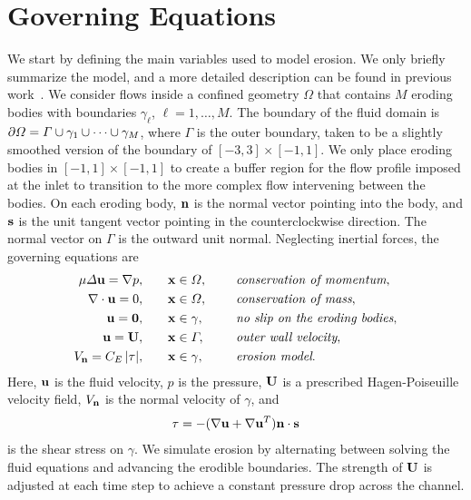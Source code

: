 \documentclass{jfm}
\begin{document}
\section{Governing Equations}
\label{sec:formulation}
We start by defining the main variables used to model erosion.  We only
briefly summarize the model, and a more detailed description can be
found in previous work~\citep{qua-moo2018}.  We consider flows inside a
confined geometry $\Omega$ that contains $M$ eroding bodies with
boundaries $\gamma_\ell$, $\ell = 1,\ldots,M$.  The boundary of the
fluid domain is $\bd \Omega = \Gamma \cup \gamma_1 \cup \cdots \cup
\gamma_M$, where $\Gamma$ is the outer boundary, taken to be a slightly
smoothed version of the boundary of $[-3,3] \times [-1,1]$.  We only
place eroding bodies in $[-1,1] \times [-1,1]$ to create a buffer region
for the flow profile imposed at the inlet to transition to the more
complex flow intervening between the bodies. On each eroding body, $\nn$
is the normal vector pointing into the body, and $\ss$ is the unit
tangent vector pointing in the counterclockwise direction.  The normal
vector on $\Gamma$ is the outward unit normal.  Neglecting inertial
forces, the governing equations are
\begin{equation}
\label{eqn:erosionModel}
  \begin{split}
    \mu \Delta \uu = \grad p, &\hspace{20pt} \xx \in \Omega, \gap 
      &&\mbox{\em conservation of momentum}, \\
    \grad \cdot \uu = 0, &\hspace{20pt} \xx \in \Omega, \gap 
      &&\mbox{\em conservation of mass}, \\
    \uu = \mathbf{0}, &\hspace{20pt} \xx \in \gamma, \gap 
      &&\mbox{\em no slip on the eroding bodies}, \\
    \uu = \UU, &\hspace{20pt} \xx \in \Gamma, \gap 
      &&\mbox{\em outer wall velocity}, \\
    \Vn = \CE \, \abs{\tau}, &\hspace{20pt} \xx \in \gamma,
      &&\mbox{\em erosion model}.
  \end{split}
\end{equation}
Here, $\uu$ is the fluid velocity, $p$ is the pressure, $\UU$ is a
prescribed Hagen-Poiseuille velocity field, $\Vn$ is the normal velocity
of $\gamma$, and
\begin{align}
  \tau = -(\nabla \uu + \nabla \uu^T) \nn \cdot \ss
  \label{eqn:shearStress}
\end{align}
is the shear stress on $\gamma$. We simulate erosion by alternating
between solving the fluid equations and advancing the erodible
boundaries. The strength of $\UU$ is adjusted at each time step to
achieve a constant pressure drop across the channel.
\end{document}
